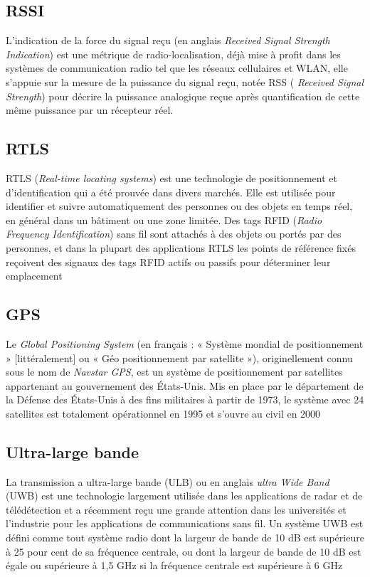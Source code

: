 \documentclass[12pt,a4paper]{report}
\begin{document}
\subsection{RSSI}

 L'indication de la force du signal reçu (en anglais \textit{Received Signal Strength Indication}) est une métrique de radio-localisation, déjà mise à profit dans les systèmes de communication radio tel que les réseaux cellulaires et WLAN, elle s’appuie sur la mesure de la puissance du signal reçu, notée RSS ( \textit{Received Signal Strength}) pour décrire la puissance analogique reçue après quantification de cette même puissance par un récepteur réel.\cite{PHD:rssi}

\subsection{RTLS}

RTLS (\textit{Real-time locating systems}) est une technologie de positionnement et d'identification qui a été prouvée dans divers marchés. Elle est utilisée pour identifier et suivre automatiquement des personnes ou des objets en temps réel, en général dans un bâtiment ou une zone limitée. Des tags RFID (\textit{Radio Frequency Identification}) sans fil sont attachés à des objets ou portés par des personnes, et dans la plupart des applications RTLS les points de référence fixés reçoivent des signaux des tags RFID actifs ou passifs pour déterminer leur emplacement\cite{rtls}


\subsection{GPS}

Le \textit{Global Positioning System} (en français : « Système mondial de positionnement » [littéralement] ou « Géo positionnement par satellite »), originellement connu sous le nom de \textit{Navstar GPS}, est un système de positionnement par satellites appartenant au gouvernement des États-Unis. Mis en place par le département de la Défense des États-Unis à des fins militaires à partir de 1973, le système avec 24 satellites est totalement opérationnel en 1995 et s'ouvre au civil en 2000\cite{gps}


\subsection{Ultra-large bande }

La transmission a ultra-large bande (ULB) ou en anglais \textit{ultra Wide Band} (UWB) est une technologie largement utilisée dans les applications de radar et de télédétection et a récemment reçu une grande attention dans les universités et l'industrie pour les applications de communications sans fil. Un système UWB est défini comme tout système radio dont la largeur de bande de 10 dB est supérieure à 25 pour cent de sa fréquence centrale, ou dont la largeur de bande de 10 dB est égale ou supérieure à 1,5 GHz si la fréquence centrale est supérieure à 6 GHz \cite{uwb}
\end{document}
